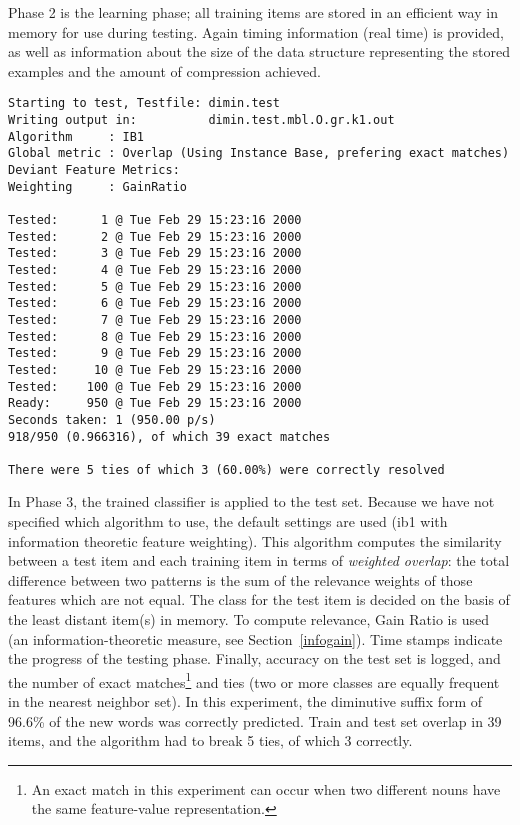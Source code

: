 \documentclass{report}
\begin{document}
\hline
\vspace{1cm}

Phase 2 is the learning phase; all training items are stored in an
efficient way in memory for use during testing. Again timing
information (real time) is provided, as well as information about the
size of the data structure representing the stored examples and the
amount of compression achieved. 

\vspace{1cm}
\hline

{\small
\begin{verbatim}
Starting to test, Testfile: dimin.test
Writing output in:          dimin.test.mbl.O.gr.k1.out
Algorithm     : IB1
Global metric : Overlap (Using Instance Base, prefering exact matches)
Deviant Feature Metrics:
Weighting     : GainRatio
 
Tested:      1 @ Tue Feb 29 15:23:16 2000
Tested:      2 @ Tue Feb 29 15:23:16 2000
Tested:      3 @ Tue Feb 29 15:23:16 2000
Tested:      4 @ Tue Feb 29 15:23:16 2000
Tested:      5 @ Tue Feb 29 15:23:16 2000
Tested:      6 @ Tue Feb 29 15:23:16 2000
Tested:      7 @ Tue Feb 29 15:23:16 2000
Tested:      8 @ Tue Feb 29 15:23:16 2000
Tested:      9 @ Tue Feb 29 15:23:16 2000
Tested:     10 @ Tue Feb 29 15:23:16 2000
Tested:    100 @ Tue Feb 29 15:23:16 2000
Ready:     950 @ Tue Feb 29 15:23:16 2000
Seconds taken: 1 (950.00 p/s)
918/950 (0.966316), of which 39 exact matches
 
There were 5 ties of which 3 (60.00%) were correctly resolved          
\end{verbatim}
}

\hline
\vspace{1cm}

In Phase 3, the trained classifier is applied to the test set. Because
we have not specified which algorithm to use, the default settings are
used ({\sc ib1} with information theoretic feature weighting). This
algorithm computes the similarity between a test item and each
training item in terms of {\em weighted overlap}: the total difference
between two patterns is the sum of the relevance weights of those
features which are not equal. The class for the test item is decided
on the basis of the least distant item(s) in memory. To compute
relevance, Gain Ratio is used (an information-theoretic measure, see
Section~\ref{infogain}). Time stamps indicate the progress of the
testing phase. Finally, accuracy on the test set is logged, and the
number of exact matches\footnote{An exact match in this experiment can
occur when two different nouns have the same feature-value
representation.} and ties (two or more classes are equally frequent in
the nearest neighbor set). In this experiment, the diminutive suffix
form of 96.6\% of the new words was correctly predicted. Train and
test set overlap in 39 items, and the algorithm had to break 5 ties,
of which 3 correctly.
\end{document}
